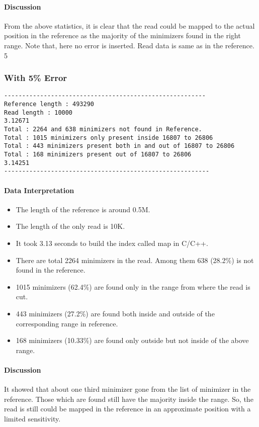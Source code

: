 \documentclass{standalone}
\begin{document}
\paragraph*{Discussion}
From the above statistics, it is clear that the read could be mapped to the actual position in the reference as the majority of the minimizers found in the right range. Note that, here no error is inserted. Read data is same as in the reference.
5%

\subsubsection*{With 5\% Error}
\begin{verbatim}
--------------------------------------------------------
Reference length : 493290
Read length : 10000
3.12671
Total : 2264 and 638 minimizers not found in Reference.
Total : 1015 minimizers only present inside 16807 to 26806
Total : 443 minimizers present both in and out of 16807 to 26806
Total : 168 minimizers present out of 16807 to 26806
3.14251
---------------------------------------------------------
\end{verbatim}
\paragraph*{Data Interpretation}
\begin{itemize}
	\item The length of the reference is around 0.5M.
	\item The length of the only read is 10K.
	\item It took 3.13 seconds to build the index called map in C/C++.
	\item There are total 2264 minimizers in the read. Among them 638 (28.2\%) is not found in the reference.
	\item 1015 minimizers (62.4\%) are found only in the range from where the read is cut.
	\item 443 minimizers (27.2\%) are found both inside and outside of the corresponding range in reference.
	\item 168 minimizers (10.33\%) are found only outside but not inside of the above range.
\end{itemize}
\paragraph*{Discussion}
It showed that about one third minimizer gone from the list of minimizer in the reference. Those which are found still have the majority inside the range. So, the read is still could be mapped in the reference in an approximate position with a limited sensitivity.
\end{document}
